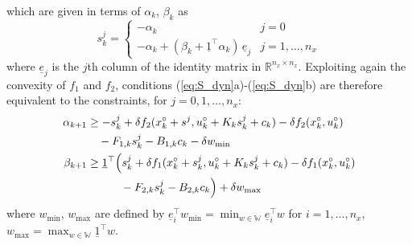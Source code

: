 \documentclass[final,5p,times,twocolumn,authoryear]{elsarticle}
\def\S{\mathbb{S}}
\def\W{\mathbb{W}}
\begin{document}
which are given in terms of $\alpha_k$, $\beta_k$ as%
\begin{equation}\label{eq:simplex_vertices}
  s_k^j = \begin{cases}
    -\alpha_k & j = 0\\
    -\alpha_k + (\beta_k + \underline{1}^\top \alpha_k) \, \underline{e}_j & j =1,\ldots,n_x
    \end{cases}
\end{equation}
where $\underline{e}_j$ is the $j$th column of the identity matrix in $\mathbb{R}^{n_x\times n_x}$.
Exploiting again the convexity of $f_1$ and $f_2$, conditions (\ref{eq:S_dyn}a)-(\ref{eq:S_dyn}b) are therefore equivalent to the constraints, for $j=0,1,\ldots,n_x$:%
\begin{align*}
  \alpha_{k+1} &\geq {-s_k^{j}}
                 + \delta f_2 (x_k^\circ+s^{j} , u_k^\circ + K_k s_k^{j} + c_k )- \delta f_2 (x_k^\circ , u_k^\circ )
  \nonumber \\
  & \quad - F_{1,k} s_k^{j} - B_{1,k} c_k - \delta w_{\min}
  \\
  \beta_{k+1} &\geq \underline{1}^\top \Bigl( s_k^{j}
                + \delta f_1 (x_k^\circ + s_k^j , u_k^\circ + K_k s_k^j + c_k)- \delta f_1 (x_k^\circ,  u_k^\circ )
    \nonumber \\
  &\quad\qquad - F_{2,k} s_k^j - B_{2,k} c_k\Bigr) + \delta w_{\max}
\end{align*}
where $w_{\min}$, $w_{\max}$ are defined by
$\underline{e}_i^\top w_{\min} = \min_{w\in\W} \underline{e}_i^\top w$ for $i=1,\ldots,n_x$, $w_{\max}=\max_{w\in\W} \underline{1}^\top w$.
\end{document}
